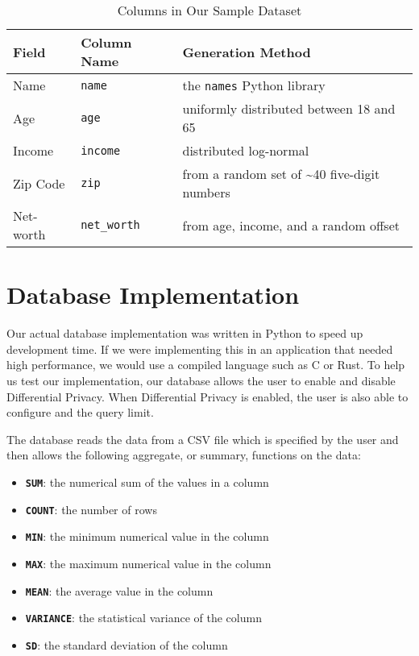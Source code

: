 \documentclass[conference,11pt]{IEEEtran}
\begin{document}
\begin{table*}[h]
    \caption{Columns in Our Sample Dataset}\label{tab:cols}
    \centering
    \begin{tabular}{l | l | l}
        \textbf{Field} & \textbf{Column Name} & \textbf{Generation Method} \\
        \hline
        Name & \texttt{name} & the \texttt{names} Python library \\
        Age & \texttt{age} & uniformly distributed between 18 and 65 \\
        Income & \texttt{income} & distributed log-normal \\
        Zip Code & \texttt{zip} & from a random set of \textasciitilde40
            five-digit numbers \\
        Net-worth & \texttt{net\_worth} & from age, income, and a random offset
    \end{tabular}
\end{table*}

\section{Database Implementation}\label{sec:db-impl}
Our actual database implementation was written in Python to speed up development
time. If we were implementing this in an application that needed high
performance, we would use a compiled language such as C or Rust.  To help us
test our implementation, our database allows the user to enable and disable
Differential Privacy. When Differential Privacy is enabled, the user is also
able to configure {\textepsilon} and the query limit.

The database reads the data from a CSV file which is specified by the user and
then allows the following aggregate, or summary, functions on the data:
\begin{itemize}
    \item \textbf{\texttt{SUM}}: the numerical sum of the values in a column
    \item \textbf{\texttt{COUNT}}: the number of rows
    \item \textbf{\texttt{MIN}}: the minimum numerical value in the column
    \item \textbf{\texttt{MAX}}: the maximum numerical value in the column
    \item \textbf{\texttt{MEAN}}: the average value in the column
    \item \textbf{\texttt{VARIANCE}}: the statistical variance of the column
    \item \textbf{\texttt{SD}}: the standard deviation of the column
\end{itemize}
\end{document}
